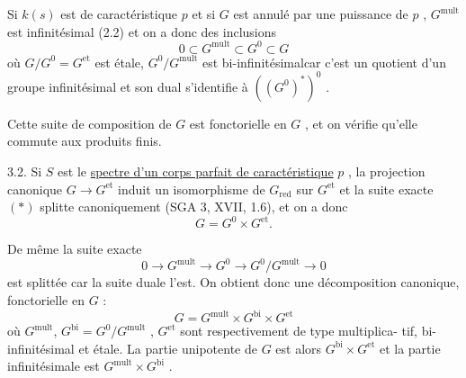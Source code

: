 
Si $k(s)$ est de caractéristique $p$ et si $G$ est annulé
par une puissance de $p$ , $G^{\mathrm{mult}}$ est infinitésimal (2.2) et on a donc
des inclusions
\[ 0 \subset G^{\mathrm{mult}} \subset G^{0} \subset G \]
 où $G/G^{0} = G^{\mathrm{et}}$ est étale, $G^{0}/G^{\mathrm{mult}}$ est bi-infinitésimal\hand{,}\deleted{(}car c'est
un quotient d'un groupe infinitésimal et son dual s'identifie à $((G^{0})^{*})^{0}$ .

Cette suite de composition de $G$ est fonctorielle en $G$ ,
et on vérifie qu'elle commute aux produits finis.

3.2. Si $S$ est le \uline{spectre d'un corps parfait de caractéristique} $p$ ,
la projection canonique $G \to G^{\mathrm{et}}$ induit un isomorphisme de $G_{\mathrm{red}}$ sur
$G^{\mathrm{et}}$ et la suite exacte $(*)$ splitte canoniquement (SGA 3, XVII, 1.6),
et on a donc
\[ G = G^{0} \times G^{\mathrm{et}} . \]

De même la suite exacte
\[ 0 \to G^{\mathrm{mult}} \to G^{0} \to G^{0}/G^{\mathrm{mult}} \to 0 \]
est splittée car la suite duale l'est. On obtient donc une décomposition
canonique, fonctorielle en $G$ :
\[ G = G^{\mathrm{mult}} \times G^{\mathrm{bi}} \times G^{\mathrm{et}} \]
où $G^{\mathrm{mult}}$, $G^{\mathrm{bi}} = G^{0}/G^{\mathrm{mult}}$ , $G^{\mathrm{et}}$ sont respectivement de type multiplica-%
tif, bi-infinitésimal et étale. La partie unipotente de $G$ est alors
$G^{\mathrm{bi}} \times G^{\mathrm{et}}$ et la partie infinitésimale est $G^{\mathrm{mult}} \times G^{\mathrm{bi}}$ .


